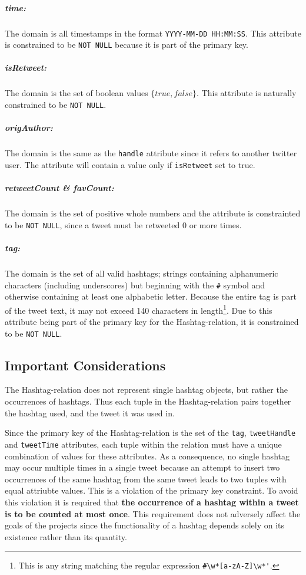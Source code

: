 \documentclass[a4paper, 12pt]{report}
\begin{document}
\subparagraph{time:}
The domain is all timestamps in the format \texttt{YYYY-MM-DD HH:MM:SS}. This attribute is constrained to be \texttt{NOT NULL} because it is part of the primary key.

\subparagraph{isRetweet:}
The domain is the set of boolean values $\{true, false\}$. This attribute is naturally constrained to be \texttt{NOT NULL}.

\subparagraph{origAuthor:}
The domain is the same as the \texttt{handle} attribute since it refers to another twitter user. The attribute will contain a value only if \texttt{isRetweet} set to true.

\subparagraph{retweetCount \& favCount:}
The domain is the set of positive whole numbers and the attribute is constrainted to be \texttt{NOT NULL}, since a tweet must be retweeted 0 or more times.

\subparagraph{tag:}
The domain is the set of all valid hashtags; strings containing alphanumeric characters (including underscores) but beginning with the \texttt{\#} symbol and otherwise containing at least one alphabetic letter. Because the entire tag is part of the tweet text, it may not exceed 140 characters in length\footnote{This is any string matching the regular expression \verb+#\w*[a-zA-Z]\w*'+.}. Due to this attribute being part of the primary key for the Hashtag-relation, it is constrained to be \texttt{NOT NULL}.

\subsection{Important Considerations}
\label{subsec:considerations}

The Hashtag-relation does not represent single hashtag objects, but rather the occurrences of hashtags. Thus each tuple in the Hashtag-relation pairs together the hashtag used, and the tweet it was used in.

Since the primary key of the Hashtag-relation is the set of the \texttt{tag}, \texttt{tweetHandle} and \texttt{tweetTime} attributes, each tuple within the relation must have a unique combination of values for these attributes. As a consequence, no single hashtag may occur multiple times in a single tweet because an attempt to insert two occurrences of the same hashtag from the same tweet leads to two tuples with equal attriubte values. This is a violation of the primary key constraint. To avoid this violation it is required that \textbf{the occurrence of a hashtag within a tweet is to be counted at most once}. This requirement does not adversely affect the goals of the projects since the functionality of a hashtag depends solely on its existence rather than its quantity.
\end{document}

